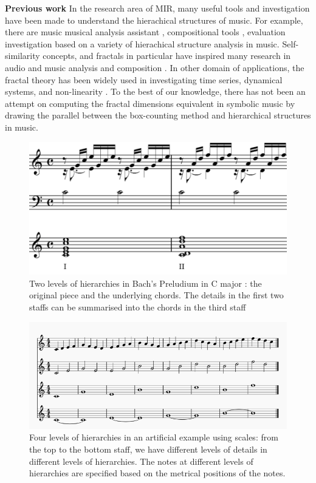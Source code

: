 \documentclass{article}
\begin{document}
\textbf{Previous work}
In the research area of MIR, many useful tools and investigation have been made to understand the hierachical structures of music.
For example, there are music musical analysis assistant \cite{hamanaka2009interactive, hamanaka2005atta}, compositional tools \cite{hamanaka2004automatic, hamanaka2005automatic}, evaluation investigation \cite{mcfee2017evaluating, mcfee2015hierarchical} based on a variety of hierachical structure analysis in music.
Self-similarity concepts, and fractals in particular have inspired many research in audio and music analysis \cite{bigerelle2000fractal,hsu1990fractal,hsu1991self} and composition \cite{sukumaran2009generation,leach1995nature}.
In other domain of applications, the fractal theory has been widely used in investigating time series, dynamical systems, and non-linearity \cite{accardo1997use, higuchi1988approach}.
To the best of our knowledge, there has not been an attempt on computing the fractal dimensions equivalent in symbolic music by drawing the parallel between the box-counting method and hierarchical structures in music. 

\begin{figure}
  \includegraphics[width=\linewidth]{eg.png}
  \caption{Two levels of hierarchies in Bach's Preludium in C major \cite{wiki:bach}: the original piece and the underlying chords.
          The details in the first two staffs can be summarised into the chords in the third staff}
  \label{fig:egbach}
\end{figure}

\begin{figure}
  \includegraphics[width=\linewidth]{egscale.png}
  \caption{Four levels of hierarchies in an artificial example using scales: from the top to the bottom staff, we have different levels of details in different levels of hierarchies.
    The notes at different levels of hierarchies are specified based on the metrical positions of the notes.}
  \label{fig:egscale}
\end{figure}
\end{document}
